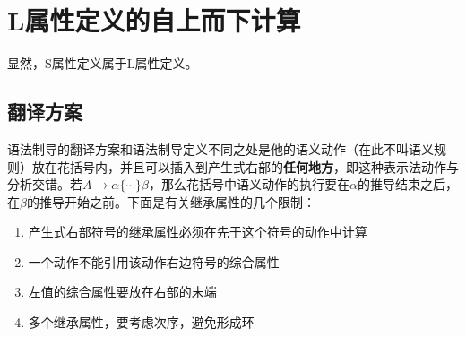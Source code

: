 \documentclass[]{report}
\begin{document}
	\section{L属性定义的自上而下计算}
	显然，S属性定义属于L属性定义。
		\subsection{翻译方案}
		语法制导的翻译方案和语法制导定义不同之处是他的语义动作（在此不叫语义规则）放在花括号内，并且可以插入到产生式右部的\textbf{任何地方}，即这种表示法动作与分析交错。若$A\to\alpha\{\cdots\}\beta$，那么花括号中语义动作的执行要在$\alpha$的推导结束之后，在$\beta$的推导开始之前。下面是有关继承属性的几个限制：
		\begin{enumerate}
			\item 产生式右部符号的继承属性必须在先于这个符号的动作中计算
			\item 一个动作不能引用该动作右边符号的综合属性
			\item 左值的综合属性要放在右部的末端
			\item 多个继承属性，要考虑次序，避免形成环
		\end{enumerate}
\end{document}
